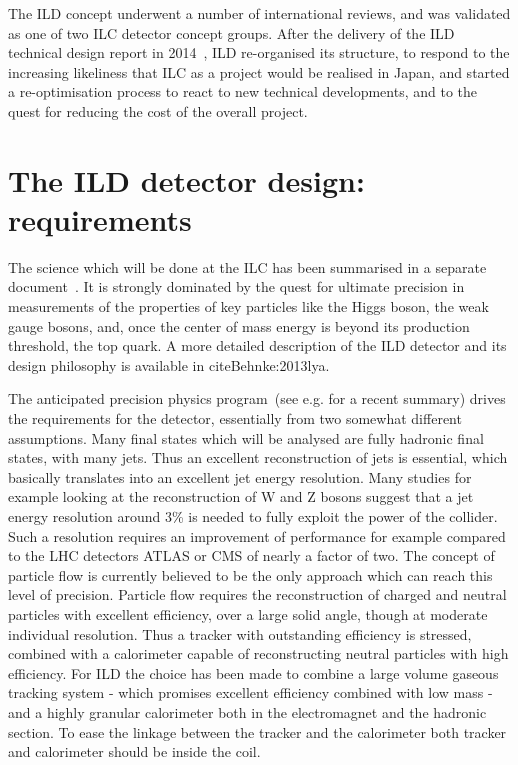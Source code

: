 \documentclass[%
 amsmath,amssymb,
 aps,
]{revtex4-1}
\begin{document}
The ILD concept underwent a number of international reviews, and was validated as one of two ILC detector concept groups. After the delivery of the ILD technical design report in 2014~\cite{Behnke:2013lya}, ILD re-organised its structure, to respond to the increasing likeliness that ILC as a project would be realised in Japan, and started a re-optimisation process to react to new technical developments, and to the quest for reducing the cost of the overall project. 

\section{The ILD detector design: requirements}
The science which will be done at the ILC has been summarised in a separate document~\cite{ILCESU1}. It is strongly dominated by the quest for ultimate precision in measurements of the properties of key particles like the Higgs boson, the weak gauge bosons, and, once the center of mass energy is beyond its production threshold, the top quark. A more detailed description of the ILD detector and its design philosophy is available in cite{Behnke:2013lya}.

The anticipated precision physics program~(see e.g. \cite{Fujii:2017vwa} for a recent summary) drives the requirements for the detector, essentially from two somewhat different assumptions. Many final states which will be analysed are fully hadronic final states, with many jets. Thus an excellent reconstruction of jets is essential, which basically translates into an excellent jet energy resolution. Many studies for example looking at the reconstruction of W and Z bosons suggest that a jet energy resolution around 3\% is needed to fully exploit the power of the collider. Such a resolution requires an improvement of performance for example compared to the LHC detectors ATLAS or CMS of nearly a factor of two. The concept of particle flow is currently believed to be the only approach which can reach this level of precision. Particle flow requires the reconstruction of charged and neutral particles with excellent efficiency, over a large solid angle, though at moderate individual resolution. Thus a tracker with outstanding efficiency is stressed, combined with a calorimeter capable of reconstructing neutral particles with high efficiency. For ILD the choice has been made to combine a large volume gaseous tracking system - which promises excellent efficiency combined with low mass - and a highly granular calorimeter both in the electromagnet and the hadronic section. To ease the linkage between the tracker and the calorimeter both tracker and calorimeter should be inside the coil. 
\end{document}
